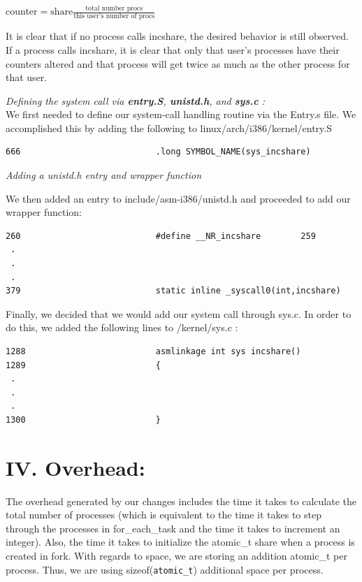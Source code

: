 \documentclass[10pt]{article}
\begin{document}
counter$ = \text{share}\frac{\text{total number procs}}{\text{this user's number of procs}}$

It is clear that if no process calls incshare, the desired behavior is still observed. If a process calls incshare, it is clear that only that user's processes have their counters altered and that process will get twice as much as the other process for that user.

{\textit{Defining the system call via \textbf{entry.S}, \textbf{unistd.h}, and \textbf{sys.c} :}} \\

We first needed to define our system-call handling routine via the Entry.s file. We accomplished this by adding the following to linux/arch/i386/kernel/entry.S \\

\begin{verbatim}
666                           .long SYMBOL_NAME(sys_incshare)
\end{verbatim}

{\textit{Adding a unistd.h entry and wrapper function}}

We then added an entry to include/asm-i386/unistd.h and proceeded to add our wrapper function:
\begin{verbatim}
260                           #define __NR_incshare        259
 .
 .
 .
379                           static inline _syscall0(int,incshare)
\end{verbatim}

Finally, we decided that we would add our system call through sys.c. In order to do this, we added the following lines to /kernel/sys.c :
\begin{verbatim}
1288                          asmlinkage int sys incshare()
1289                          {
 .
 .
 .
1300                          }
\end{verbatim}

\section{IV. Overhead:}

The overhead generated by our changes includes the time it takes to calculate the total number of processes (which is equivalent to the time it takes to step through the processes in for\_each\_task and the time it takes to increment an integer). Also, the time it takes to initialize the atomic\_t share when a process is created in fork. With regards to space, we are storing an addition atomic\_t per process. Thus, we are using sizeof(\texttt{atomic\_t}) additional space per process.
\end{document}
